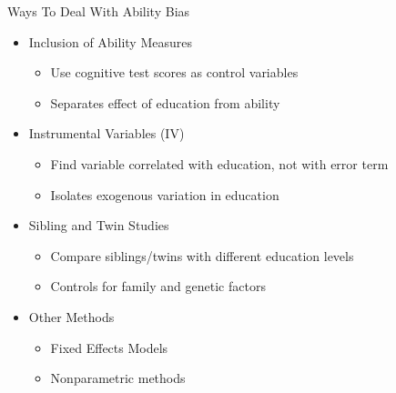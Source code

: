 \documentclass{beamer} %
\begin{document}
\begin{frame}{Ways To Deal With Ability Bias}

    \begin{itemize}
        \item<1-> Inclusion of Ability Measures
              \begin{itemize}
                  \item<2-> Use cognitive test scores as control variables
                  \item<2-> Separates effect of education from ability
              \end{itemize}
        \item<3-> Instrumental Variables (IV)
              \begin{itemize}
                  \item<4-> Find variable correlated with education, not with error term
                  \item<4-> Isolates exogenous variation in education
              \end{itemize}
        \item<5-> Sibling and Twin Studies
              \begin{itemize}
                  \item<6-> Compare siblings/twins with different education levels
                  \item<6-> Controls for family and genetic factors
              \end{itemize}
        \item<7-> Other Methods
              \begin{itemize}
                  \item<8-> Fixed Effects Models
                  \item<8-> Nonparametric methods
              \end{itemize}
    \end{itemize}

\end{frame}
\end{document}
